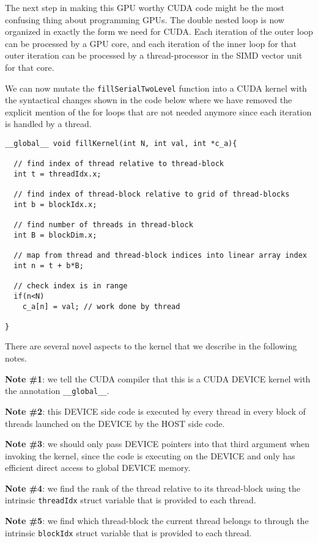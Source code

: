 The next step in making this GPU worthy CUDA code might be the most confusing thing about programming GPUs. The double nested loop is now organized in exactly the form we need for CUDA. Each iteration of the outer loop can be processed by a GPU core, and each iteration of the inner loop for that outer iteration can be processed by a thread-processor in the SIMD vector unit for that core. 

We can now mutate the \texttt{fillSerialTwoLevel} function into a CUDA kernel with the syntactical changes shown in the code below where we have removed the explicit mention of the for loops that are not needed anymore since each iteration is handled by a thread. 

\begin{verbatim}
__global__ void fillKernel(int N, int val, int *c_a){

  // find index of thread relative to thread-block
  int t = threadIdx.x;
  
  // find index of thread-block relative to grid of thread-blocks
  int b = blockIdx.x;
  
  // find number of threads in thread-block
  int B = blockDim.x;

  // map from thread and thread-block indices into linear array index
  int n = t + b*B;

  // check index is in range
  if(n<N)
    c_a[n] = val; // work done by thread

}
\end{verbatim}
There are several novel aspects to the kernel that we describe in the following notes.

{\bf Note \#1}: we tell the CUDA compiler that this is a CUDA DEVICE kernel with the annotation \texttt{\_\_global\_\_}. 

{\bf Note \#2}: this DEVICE side code is executed by every thread in every block of threads launched on the DEVICE by the HOST side code.

{\bf Note \#3}: we should only pass DEVICE pointers into that third argument when invoking the kernel, since the code is executing on the DEVICE and only has efficient direct access to global DEVICE memory.

{\bf Note \#4}: we find the rank of the thread relative to its thread-block using the intrinsic \texttt{threadIdx} struct variable that is provided to each thread.

{\bf Note \#5}: we find which thread-block the current thread belongs to through the intrinsic \texttt{blockIdx} struct variable that is provided to each thread.

